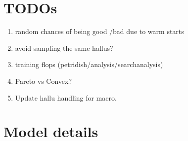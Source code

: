 \documentclass{article}
\begin{document}
\section{TODOs}
\begin{enumerate}
    \item random chances of being good /bad due to warm starts
    \item avoid sampling the same hallus?
    \item training flops (petridish/analysis/search\textunderscore analysis)
    \item Pareto vs Convex?
    \item Update hallu handling for macro. 
\end{enumerate}







\appendix
\section{Model details}
\label{sec:petridish_layer_info}
\end{document}
